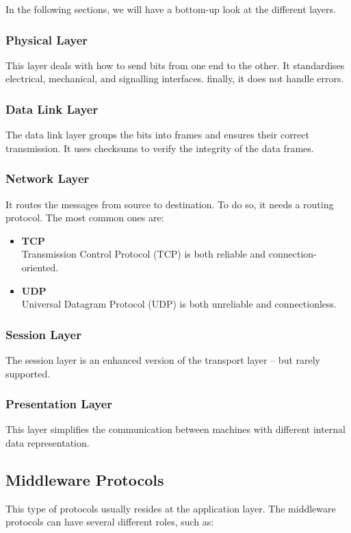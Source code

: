 \documentclass{article}
\begin{document}
\noindent In the following sections, we will have a bottom-up look at the different layers.

\subsubsection{Physical Layer}
This layer deals with how to send bits from one end to the other. It standardises electrical, mechanical, and signalling interfaces. finally, it does not handle errors.

\subsubsection{Data Link Layer}
The data link layer groups the bits into frames and ensures their correct transmission. It uses checksums to verify the integrity of the data frames.

\subsubsection{Network Layer}
It routes the messages from source to destination. To do so, it needs a routing protocol. The most common ones are:

\begin{itemize}
	\item \textbf{TCP} \\
	Transmission Control Protocol (TCP) is both reliable and connection-oriented.
	
	\item \textbf{UDP} \\
	Universal Datagram Protocol (UDP) is both unreliable and connectionless.
\end{itemize}

\subsubsection{Session Layer}
The session layer is an enhanced version of the transport layer -- but rarely supported.

\subsubsection{Presentation Layer}
This layer simplifies the communication between machines with different internal data representation.

\subsection{Middleware Protocols}
This type of protocols usually resides at the application layer. The middleware protocols can have several different roles, such as:
\end{document}
